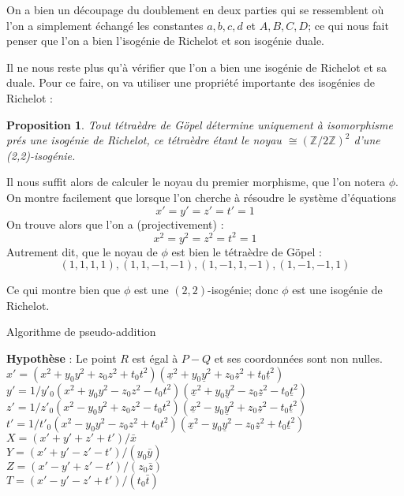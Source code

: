 \documentclass[a4paper,12pt]{article}
\newtheorem{proposition}[theoreme]{Proposition}
\theoremstyle{definition}
\theoremstyle{remark}
\numberwithin{equation}{section}
\begin{document}
On a bien un découpage du doublement en deux parties qui se ressemblent où l'on a simplement échangé les constantes $a,b,c,d$ et $A,B,C,D$; ce qui nous fait penser que l'on a bien l'isogénie de Richelot et son isogénie duale. 

Il ne nous reste plus qu'à vérifier que l'on a bien une isogénie de Richelot et sa duale. Pour ce faire, on va utiliser une propriété importante des isogénies de Richelot :
\begin{proposition}
Tout tétraèdre de G\"opel détermine uniquement à isomorphisme prés une isogénie de Richelot, ce tétraèdre étant le noyau $\cong (\mathbb{Z}/2\mathbb{Z})^2$ d'une (2,2)-isogénie.
\end{proposition}

Il nous suffit alors de calculer le noyau du premier morphisme, que l'on notera $\phi$. On montre facilement que lorsque l'on cherche à résoudre le système d'équations
$$x' = y' = z' = t' = 1$$
On trouve alors que l'on a (projectivement) :
$$x^2 = y^2 = z^2 = t^2 = 1$$
Autrement dit, que le noyau de $\phi$ est bien le tétraèdre de G\"opel :
$$(1,1,1,1),(1,1,-1,-1),(1,-1,1,-1),(1,-1,-1,1)$$

Ce qui montre bien que $\phi$ est une $(2,2)$-isogénie; donc $\phi$ est une isogénie de Richelot.

\begin{algorithm}
\label{ADD2}
\caption{Algorithme de pseudo-addition}
\textbf{Hypothèse} : Le point $R$ est égal à $P-Q$ et ses coordonnées sont non nulles. \\
$x' = (x^2 + y_0y^2 + z_0z^2 + t_0t^2)(\underline{x}^2 + y_0\underline{y}^2 + z_0\underline{z}^2 + t_0\underline{t}^2)$ \\
$y' = 1/y'_0(x^2 + y_0y^2 - z_0z^2 - t_0t^2)(\underline{x}^2 + y_0\underline{y}^2 - z_0\underline{z}^2 - t_0\underline{t}^2)$ \\
$z' = 1/z'_0(x^2 - y_0y^2 + z_0z^2 - t_0t^2)(\underline{x}^2 - y_0\underline{y}^2 + z_0\underline{z}^2 - t_0\underline{t}^2)$ \\
$t' = 1/t'_0(x^2 - y_0y^2 - z_0z^2 + t_0t^2)(\underline{x}^2 - y_0\underline{y}^2 - z_0\underline{z}^2 + t_0\underline{t}^2)$ \\
$X = (x' + y' + z' + t')/\bar{x}$ \\
$Y = (x' + y' - z' - t')/(y_0\bar{y})$ \\
$Z = (x' - y' + z' - t')/(z_0\bar{z})$ \\
$T = (x' - y' - z' + t')/(t_0\bar{t})$ \\
\end{algorithm}
\end{document}
